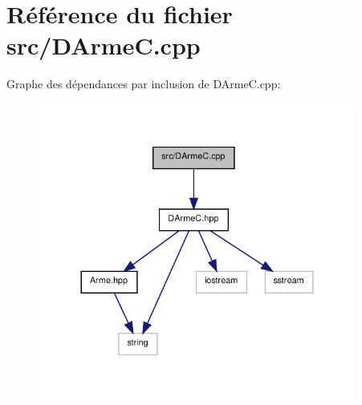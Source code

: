\section{Référence du fichier src/\-D\-Arme\-C.cpp}
\label{_d_arme_c_8cpp}
Graphe des dépendances par inclusion de D\-Arme\-C.\-cpp\-:\nopagebreak
\begin{figure}[H]
\begin{center}
\leavevmode
\includegraphics[width=296pt]{_d_arme_c_8cpp__incl}
\end{center}
\end{figure}
